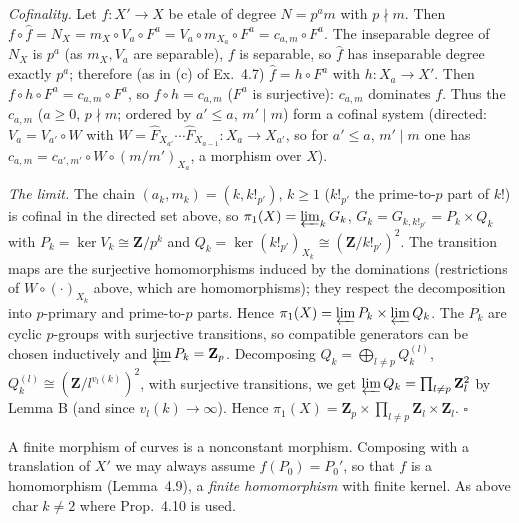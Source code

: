 \documentclass[11pt]{article}
\begin{document}
\emph{Cofinality.} Let $f:X'\to X$ be etale of degree $N=p^am$ with $p\nmid m$. Then $f\circ\hat f=N_X=m_X\circ V_a\circ F^a=V_a\circ m_{X_a}\circ F^a=c_{a,m}\circ F^a$. The inseparable degree of $N_X$ is $p^a$ (as $m_X,V_a$ are separable), $f$ is separable, so $\hat f$ has inseparable degree exactly $p^a$; therefore (as in (c) of Ex.~4.7) $\hat f=h\circ F^a$ with $h:X_a\to X'$. Then $f\circ h\circ F^a=c_{a,m}\circ F^a$, so $f\circ h=c_{a,m}$ ($F^a$ is surjective): $c_{a,m}$ dominates $f$. Thus the $c_{a,m}$ ($a\ge0$, $p\nmid m$; ordered by $a'\le a$, $m'\mid m$) form a cofinal system (directed: $V_a=V_{a'}\circ W$ with $W=\hat F_{X_{a'}}\cdots\hat F_{X_{a-1}}:X_a\to X_{a'}$, so for $a'\le a$, $m'\mid m$ one has $c_{a,m}=c_{a',m'}\circ W\circ(m/m')_{X_a}$, a morphism over $X$).

\emph{The limit.} The chain $(a_k,m_k)=(k,k!_{p'})$, $k\ge1$ ($k!_{p'}$ the prime-to-$p$ part of $k!$) is cofinal in the directed set above, so $\pi_1(X)=\varprojlim_kG_k$, $G_k=G_{k,k!_{p'}}=P_k\times Q_k$ with $P_k=\ker V_k\cong\mathbf Z/p^k$ and $Q_k=\ker(k!_{p'})_{X_k}\cong(\mathbf Z/k!_{p'})^2$. The transition maps are the surjective homomorphisms induced by the dominations (restrictions of $W\circ(\cdot)_{X_k}$ above, which are homomorphisms); they respect the decomposition into $p$-primary and prime-to-$p$ parts. Hence $\pi_1(X)=\varprojlim P_k\times\varprojlim Q_k$. The $P_k$ are cyclic $p$-groups with surjective transitions, so compatible generators can be chosen inductively and $\varprojlim P_k=\mathbf Z_p$. Decomposing $Q_k=\bigoplus_{l\ne p}Q_k^{(l)}$, $Q_k^{(l)}\cong(\mathbf Z/l^{v_l(k)})^2$, with surjective transitions, we get $\varprojlim Q_k=\prod_{l\ne p}\mathbf Z_l^2$ by Lemma B (and since $v_l(k)\to\infty$). Hence $\pi_1(X)=\mathbf Z_p\times\prod_{l\ne p}\mathbf Z_l\times\mathbf Z_l$. \hfill$\square$

\pf
A finite morphism of curves is a nonconstant morphism. Composing with a translation of $X'$ we may always assume $f(P_0)=P_0'$, so that $f$ is a homomorphism (Lemma~4.9), a \emph{finite homomorphism} with finite kernel. As above $\operatorname{char}k\ne2$ where Prop.~4.10 is used.
\end{document}
